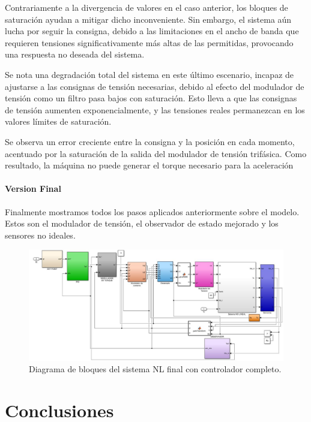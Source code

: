 \documentclass{article}
\begin{document}
Contrariamente a la divergencia de valores en el caso anterior, los bloques de saturación ayudan a mitigar dicho 
inconveniente. Sin embargo, el sistema aún lucha por seguir la consigna, debido a las limitaciones en el ancho de 
banda que requieren tensiones significativamente más altas de las permitidas, provocando una respuesta no deseada 
del sistema.

Se nota una degradación total del sistema en este último escenario, incapaz de ajustarse a las consignas de tensión 
necesarias, debido al efecto del modulador de tensión como un filtro pasa bajos con saturación. Esto lleva a que las
consignas de tensión aumenten exponencialmente, y las tensiones reales permanezcan en los valores límites de 
saturación.

Se observa un error creciente entre la consigna y la posición en cada momento, acentuado por la saturación de la 
salida del modulador de tensión trifásica. Como resultado, la máquina no puede generar el torque necesario para la 
aceleración


\subsection{Version Final}

Finalmente mostramos todos los pasos aplicados anteriormente sobre el modelo. Estos son el modulador de tensión,
el observador de estado mejorado y los sensores no ideales.

\begin{figure}[H]
    \centering
    \includegraphics[width=1\textwidth]{5.2.6.png}
    \caption{Diagrama de bloques del sistema NL final con controlador completo.}
\end{figure}

\newpage

\part*{Conclusiones}
\end{document}
